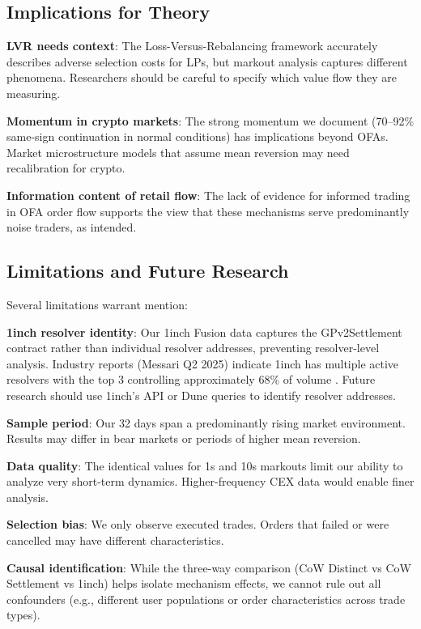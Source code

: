 \documentclass[12pt,a4paper]{article}
\begin{document}
\subsection{Implications for Theory}

\textbf{LVR needs context}: The Loss-Versus-Rebalancing framework accurately describes adverse selection costs for LPs, but markout analysis captures different phenomena. Researchers should be careful to specify which value flow they are measuring.

\textbf{Momentum in crypto markets}: The strong momentum we document (70--92\% same-sign continuation in normal conditions) has implications beyond OFAs. Market microstructure models that assume mean reversion may need recalibration for crypto.

\textbf{Information content of retail flow}: The lack of evidence for informed trading in OFA order flow supports the view that these mechanisms serve predominantly noise traders, as intended.

\subsection{Limitations and Future Research}

Several limitations warrant mention:

\textbf{1inch resolver identity}: Our 1inch Fusion data captures the GPv2Settlement contract rather than individual resolver addresses, preventing resolver-level analysis. Industry reports (Messari Q2 2025) indicate 1inch has multiple active resolvers with the top 3 controlling approximately 68\% of volume \citep{messari2025}. Future research should use 1inch's API or Dune queries to identify resolver addresses.

\textbf{Sample period}: Our 32 days span a predominantly rising market environment. Results may differ in bear markets or periods of higher mean reversion.

\textbf{Data quality}: The identical values for 1s and 10s markouts limit our ability to analyze very short-term dynamics. Higher-frequency CEX data would enable finer analysis.

\textbf{Selection bias}: We only observe executed trades. Orders that failed or were cancelled may have different characteristics.

\textbf{Causal identification}: While the three-way comparison (CoW Distinct vs CoW Settlement vs 1inch) helps isolate mechanism effects, we cannot rule out all confounders (e.g., different user populations or order characteristics across trade types).
\end{document}
